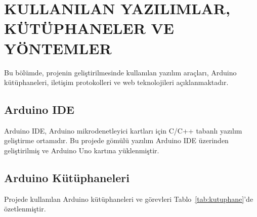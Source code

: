 \section{KULLANILAN YAZILIMLAR, KÜTÜPHANELER VE YÖNTEMLER}

Bu bölümde, projenin geliştirilmesinde kullanılan yazılım araçları, Arduino kütüphaneleri, iletişim protokolleri ve web teknolojileri açıklanmaktadır.

\subsection{Arduino IDE}

Arduino IDE, Arduino mikrodenetleyici kartları için C/C++ tabanlı yazılım geliştirme ortamıdır. Bu projede gömülü yazılım Arduino IDE üzerinden geliştirilmiş ve Arduino Uno kartına yüklenmiştir.

\subsection{Arduino Kütüphaneleri}

Projede kullanılan Arduino kütüphaneleri ve görevleri Tablo~\ref{tab:kutuphane}'de özetlenmiştir.

\begin{table}[!ht]
    \centering
    \caption{Projede kullanılan Arduino kütüphaneleri}
    \label{tab:kutuphane}
\end{table}

